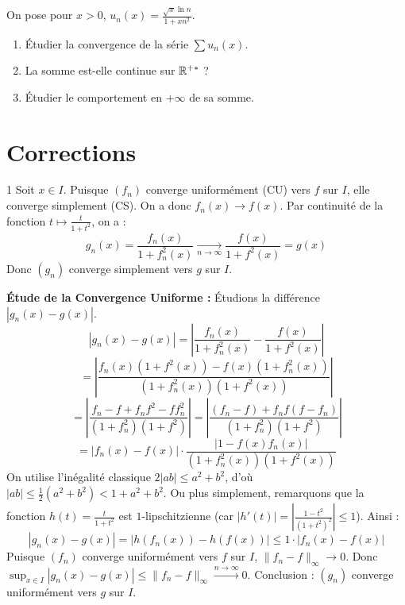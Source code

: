 \documentclass{prepacours}
\begin{document}
\begin{exercice}
On pose pour $x>0$, $u_n(x) = \frac{\sqrt{x} \ln n}{1+x n^2}$.
\begin{enumerate}
    \item Étudier la convergence de la série $\sum u_n(x)$.
    \item La somme est-elle continue sur $\mathbb{R}^{+*}$ ?
    \item Étudier le comportement en $+\infty$ de sa somme.
\end{enumerate}
\end{exercice}

\newpage
\section{Corrections}

\begin{correction}{1}
Soit $x \in I$. Puisque $(f_n)$ converge uniformément (CU) vers $f$ sur $I$, elle converge simplement (CS).
On a donc $f_n(x) \to f(x)$.
Par continuité de la fonction $t \mapsto \frac{t}{1+t^2}$, on a :
$$ g_n(x) = \frac{f_n(x)}{1+f_n^2(x)} \xrightarrow[n\to\infty]{} \frac{f(x)}{1+f^2(x)} = g(x) $$
Donc $(g_n)$ converge simplement vers $g$ sur $I$.

\textbf{Étude de la Convergence Uniforme :}
Étudions la différence $|g_n(x) - g(x)|$.
$$ |g_n(x) - g(x)| = \left| \frac{f_n(x)}{1+f_n^2(x)} - \frac{f(x)}{1+f^2(x)} \right| $$
$$ = \left| \frac{f_n(x)(1+f^2(x)) - f(x)(1+f_n^2(x))}{(1+f_n^2(x))(1+f^2(x))} \right| $$
$$ = \left| \frac{f_n - f + f_n f^2 - f f_n^2}{(1+f_n^2)(1+f^2)} \right| = \left| \frac{(f_n - f) + f_n f (f - f_n)}{(1+f_n^2)(1+f^2)} \right| $$
$$ = |f_n(x) - f(x)| \cdot \frac{|1 - f(x)f_n(x)|}{(1+f_n^2(x))(1+f^2(x))} $$
On utilise l'inégalité classique $2|ab| \le a^2 + b^2$, d'où $|ab| \le \frac{1}{2}(a^2+b^2) < 1+a^2+b^2$. Ou plus simplement, remarquons que la fonction $h(t) = \frac{t}{1+t^2}$ est $1$-lipschitzienne (car $|h'(t)| = |\frac{1-t^2}{(1+t^2)^2}| \le 1$).
Ainsi :
$$ |g_n(x) - g(x)| = |h(f_n(x)) - h(f(x))| \le 1 \cdot |f_n(x) - f(x)| $$
Puisque $(f_n)$ converge uniformément vers $f$ sur $I$, $\|f_n - f\|_\infty \to 0$.
Donc $\sup_{x \in I} |g_n(x) - g(x)| \le \|f_n - f\|_\infty \xrightarrow{n\to\infty} 0$.
Conclusion : $(g_n)$ converge uniformément vers $g$ sur $I$.
\end{correction}
\end{document}
